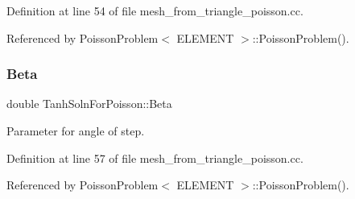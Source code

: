 Definition at line 54 of file mesh\+\_\+from\+\_\+triangle\+\_\+poisson.\+cc.



Referenced by Poisson\+Problem$<$ E\+L\+E\+M\+E\+N\+T $>$\+::\+Poisson\+Problem().

\mbox{\label{namespaceTanhSolnForPoisson_ae07364a1d73b28e5e250bda6c8954f01}} 
\subsubsection{\texorpdfstring{Beta}{Beta}}
{\footnotesize\ttfamily double Tanh\+Soln\+For\+Poisson\+::\+Beta}



Parameter for angle of step. 



Definition at line 57 of file mesh\+\_\+from\+\_\+triangle\+\_\+poisson.\+cc.



Referenced by Poisson\+Problem$<$ E\+L\+E\+M\+E\+N\+T $>$\+::\+Poisson\+Problem().

